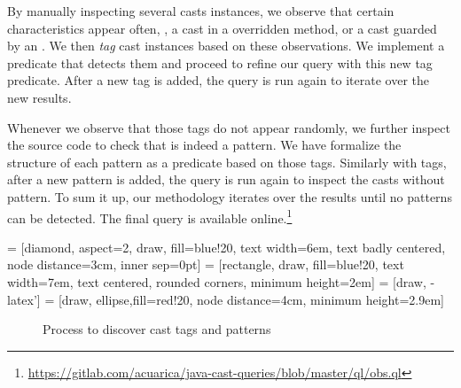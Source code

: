 By manually inspecting several casts instances, we observe that certain characteristics appear often, \eg{}, a cast in a overridden method, or a cast guarded by an .
We then \emph{tag} cast instances based on these observations.
We implement a \ql{} predicate that detects them and proceed to refine our query with this new tag predicate.
After a new tag is added, the query is run again to iterate over the new results.

Whenever we observe that those tags do not appear randomly, we further inspect the source code to check that is indeed a pattern.
We have formalize the structure of each pattern as a \ql{} predicate based on those tags.
Similarly with tags, after a new pattern is added, the query is run again to inspect the casts without pattern.
To sum it up, our methodology iterates over the results until no patterns can be detected.
The final \ql{} query is available online.\footnote{\url{https://gitlab.com/acuarica/java-cast-queries/blob/master/ql/obs.ql}}

 = [diamond, aspect=2, draw, fill=blue!20, 
    text width=6em, text badly centered, node distance=3cm, inner sep=0pt]
 = [rectangle, draw, fill=blue!20, 
    text width=7em, text centered, rounded corners, minimum height=2em]
 = [draw, -latex']
 = [draw, ellipse,fill=red!20, node distance=4cm,
    minimum height=2.9em]

\begin{figure}[h]
\centering
{}
\caption{Process to discover cast tags and patterns} \label{fig:process}
\end{figure}

% 



